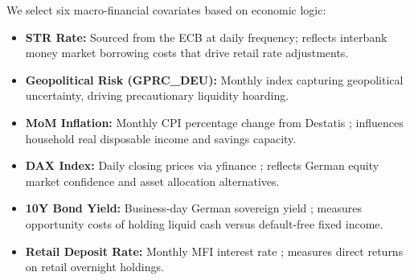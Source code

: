 \documentclass[11pt,a4paper]{article}
\newcommand{\estr}{\mbox{\texteuro STR}}
\begin{document}
We select six macro-financial covariates based on economic logic:
\begin{itemize}\small
    \item \textbf{\estr{} Rate:} Sourced from the ECB \citep{ecb_estr} at daily
    frequency; reflects interbank money market borrowing costs that drive retail
    rate adjustments.
    \item \textbf{Geopolitical Risk (GPRC\_DEU):} Monthly index
    \citep{gpr_index} capturing geopolitical uncertainty, driving
    precautionary liquidity hoarding.
    \item \textbf{MoM Inflation:} Monthly CPI percentage change from Destatis
    \citep{destatis_inflation}; influences household real disposable income and
    savings capacity.
    \item \textbf{DAX Index:} Daily closing prices via yfinance
    \citep{yfinance, yahoo_finance_dax}; reflects German equity market confidence
    and asset allocation alternatives.
    \item \textbf{10Y Bond Yield:} Business-day German sovereign yield
    \citep{bundesbank_bonds}; measures opportunity costs of holding liquid cash
    versus default-free fixed income.
    \item \textbf{Retail Deposit Rate:} Monthly MFI interest rate
    \citep{bundesbank_data}; measures direct returns on retail overnight holdings.
\end{itemize}
\end{document}
